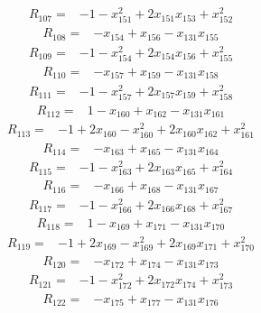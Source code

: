 \documentclass[11pt]{article}
\theoremstyle{definition}
\theoremstyle{remark}
\begin{document}
\begin{align*}
R_{107} ={}& -1 - x_{151}^{2} + 2x_{151} x_{153} + x_{152}^{2}
\end{align*}
\begin{align*}
R_{108} ={}& -x_{154} + x_{156} - x_{131} x_{155}
\end{align*}
\begin{align*}
R_{109} ={}& -1 - x_{154}^{2} + 2x_{154} x_{156} + x_{155}^{2}
\end{align*}
\begin{align*}
R_{110} ={}& -x_{157} + x_{159} - x_{131} x_{158}
\end{align*}
\begin{align*}
R_{111} ={}& -1 - x_{157}^{2} + 2x_{157} x_{159} + x_{158}^{2}
\end{align*}
\begin{align*}
R_{112} ={}& 1 - x_{160} + x_{162} - x_{131} x_{161}
\end{align*}
\begin{align*}
R_{113} ={}& -1 + 2x_{160} - x_{160}^{2} + 2x_{160} x_{162} + x_{161}^{2}
\end{align*}
\begin{align*}
R_{114} ={}& -x_{163} + x_{165} - x_{131} x_{164}
\end{align*}
\begin{align*}
R_{115} ={}& -1 - x_{163}^{2} + 2x_{163} x_{165} + x_{164}^{2}
\end{align*}
\begin{align*}
R_{116} ={}& -x_{166} + x_{168} - x_{131} x_{167}
\end{align*}
\begin{align*}
R_{117} ={}& -1 - x_{166}^{2} + 2x_{166} x_{168} + x_{167}^{2}
\end{align*}
\begin{align*}
R_{118} ={}& 1 - x_{169} + x_{171} - x_{131} x_{170}
\end{align*}
\begin{align*}
R_{119} ={}& -1 + 2x_{169} - x_{169}^{2} + 2x_{169} x_{171} + x_{170}^{2}
\end{align*}
\begin{align*}
R_{120} ={}& -x_{172} + x_{174} - x_{131} x_{173}
\end{align*}
\begin{align*}
R_{121} ={}& -1 - x_{172}^{2} + 2x_{172} x_{174} + x_{173}^{2}
\end{align*}
\begin{align*}
R_{122} ={}& -x_{175} + x_{177} - x_{131} x_{176}
\end{align*}
\end{document}
